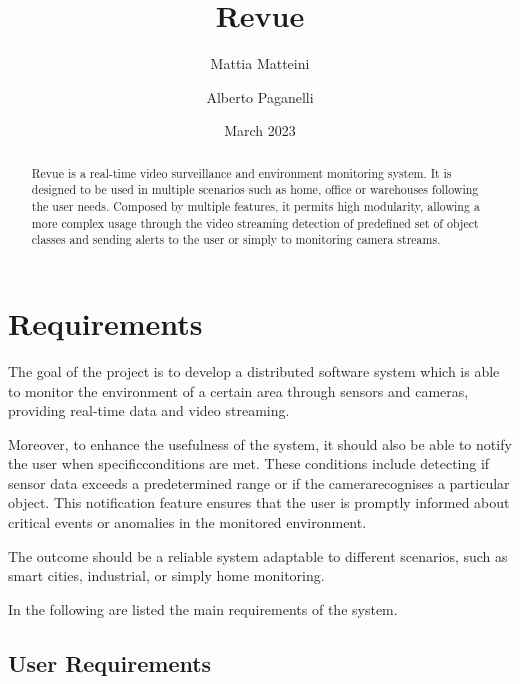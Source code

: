 \documentclass{scrartcl}
\title{
    Revue
}
\author{
    Mattia Matteini \\ \emailaddr{mattia.matteini@studio.unibo.it}
    \and
    Alberto Paganelli \\ \emailaddr{alberto.paganelli3@studio.unibo.it}
}
\date{March 2023}
\begin{document}
    \maketitle

    \begin{abstract}
        Revue is a real-time video surveillance and environment monitoring system. It is designed to be used in multiple scenarios such as home, office or warehouses following the user needs.
%
        Composed by multiple features, it permits high modularity, allowing a more complex usage through the video streaming detection of predefined set of object classes and sending alerts to the user or simply to monitoring camera streams.
    \end{abstract}


    \section{Requirements}

    The goal of the project is to develop a distributed software system which is able to monitor the environment
    of a certain area through sensors and cameras, providing real-time data and video streaming.

    Moreover, to enhance the usefulness of the system, it should also be able to notify the user when specificconditions are met.
    These conditions include detecting if sensor data exceeds a predetermined range or if the camerarecognises a particular object.
    This notification feature ensures that the user is promptly informed about critical
    events or anomalies in the monitored environment.

    The outcome should be a reliable system adaptable to different scenarios, such as smart cities, industrial, or
    simply home monitoring.

    In the following are listed the main requirements of the system.

    \subsection{User Requirements}\label{subsec:user-requirements}
\end{document}

